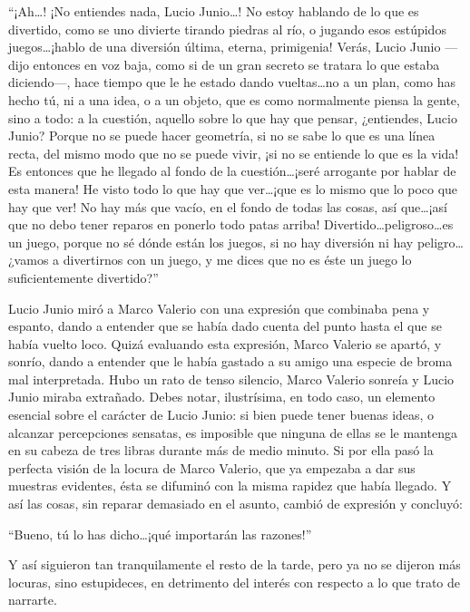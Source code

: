 \documentclass[11pt,openany]{book}
\begin{document}
“¡Ah\dots! ¡No entiendes nada, Lucio Junio\dots! No estoy hablando de lo que es divertido, como se uno divierte tirando piedras al río, o jugando esos estúpidos juegos\dots ¡hablo de una diversión última, eterna, primigenia! Verás, Lucio Junio —dijo entonces en voz baja, como si de un gran secreto se tratara lo que estaba diciendo—, hace tiempo que le he estado dando vueltas\dots no a un plan, como has hecho tú, ni a una idea, o a un objeto, que es como normalmente piensa la gente, sino a todo: a la cuestión, aquello sobre lo que hay que pensar, ¿entiendes, Lucio Junio? Porque no se puede hacer geometría, si no se sabe lo que es una línea recta, del mismo modo que no se puede vivir, ¡si no se entiende lo que es la vida! Es entonces que he llegado al fondo de la cuestión\dots ¡seré arrogante por hablar de esta manera! He visto todo lo que hay que ver\dots ¡que es lo mismo que lo poco que hay que ver! No hay más que vacío, en el fondo de todas las cosas, así que\dots ¡así que no debo tener reparos en ponerlo todo patas arriba! Divertido\dots peligroso\dots es un juego, porque no sé dónde están los juegos, si no hay diversión ni hay peligro\dots ¿vamos a divertirnos con un juego, y me dices que no es éste un juego lo suficientemente divertido?” 

Lucio Junio miró a Marco Valerio con una expresión que combinaba pena y espanto, dando a entender que se había dado cuenta del punto hasta el que se había vuelto loco. Quizá evaluando esta expresión, Marco Valerio se apartó, y sonrío, dando a entender que le había gastado a su amigo una especie de broma mal interpretada. Hubo un rato de tenso silencio, Marco Valerio sonreía y Lucio Junio miraba extrañado. Debes notar, ilustrísima, en todo caso, un elemento esencial sobre el carácter de Lucio Junio: si bien puede tener buenas ideas, o alcanzar percepciones sensatas, es imposible que ninguna de ellas se le mantenga en su cabeza de tres libras durante más de medio minuto. Si por ella pasó la perfecta visión de la locura de Marco Valerio, que ya empezaba a dar sus muestras evidentes, ésta se difuminó con la misma rapidez que había llegado. Y así las cosas, sin reparar demasiado en el asunto, cambió de expresión y concluyó: 

“Bueno, tú lo has dicho\dots ¡qué importarán las razones!” 

Y así siguieron tan tranquilamente el resto de la tarde, pero ya no se dijeron más locuras, sino estupideces, en detrimento del interés con respecto a lo que trato de narrarte. 
\end{document}
